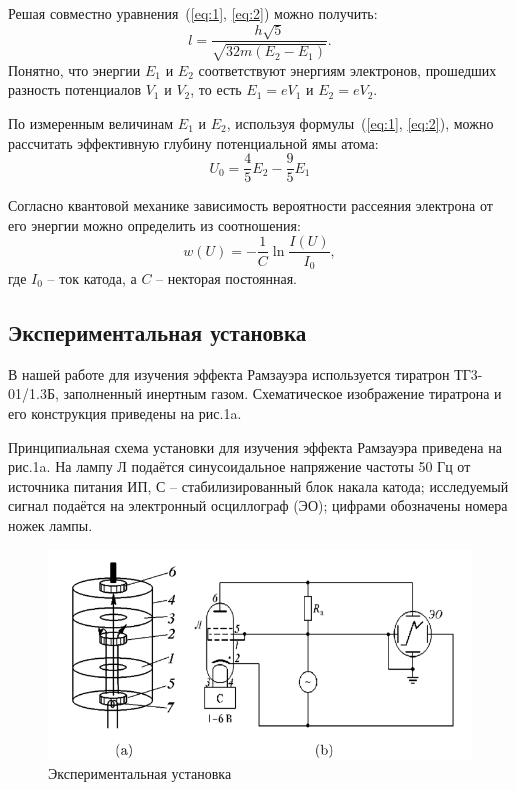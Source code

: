 \documentclass[12pt,a4paper]{article}
\begin{document}
	Решая совместно уравнения~(\ref{eq:1}, \ref{eq:2}) можно получить:
	\begin{equation}
		\label{eq:l}
		l = \frac{h\sqrt{5}}{\sqrt{32m(E_2-E_1)}}.
	\end{equation}
	Понятно, что энергии $E_1$ и $E_2$ соответствуют энергиям электронов, прошедших разность потенциалов $V_1$ и $V_2$, то есть $E_1 = eV_1$ и $E_2 = eV_2$. 
	
	По измеренным величинам $E_1$ и $E_2$, используя формулы~(\ref{eq:1}, \ref{eq:2}), можно рассчитать эффективную глубину потенциальной ямы атома:
	\begin{equation}
		\label{eq:U_0}
		U_0 = \frac{4}{5}E_2 - \frac{9}{5}E_1
	\end{equation}

	Согласно квантовой механике зависимость вероятности рассеяния электрона от его энергии можно определить из соотношения:
	\begin{equation}
		\label{eq:w}
		w(U) = -\frac{1}{C}\ln \frac{I(U)}{I_0},
	\end{equation}
	где $I_0$ -- ток катода, а $C$ -- некторая постоянная.

\subsection{Экспериментальная установка}

В нашей работе для изучения эффекта Рамзауэра используется тиратрон ТГ3-01/1.3Б, заполненный инертным газом. Схематическое изображение тиратрона и его конструкция приведены на рис.1a.
	
	Принципиальная схема установки для изучения эффекта Рамзауэра приведена на рис.1a. На лампу Л подаётся синусоидальное напряжение частоты 50 Гц от источника питания ИП, С -- стабилизированный блок накала катода; исследуемый сигнал подаётся на электронный осциллограф (ЭО); цифрами обозначены номера ножек лампы.
	
\begin{figure}[H]
	\begin{center}
		\includegraphics[width=14cm]{5.1.3-1}
		\caption{Экспериментальная установка}
	\end{center}
\end{figure}
	
\end{document}
